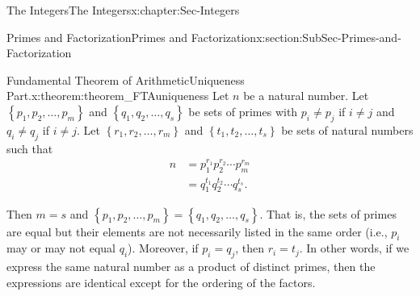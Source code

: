 \documentclass[oneside,10pt,]{book}
\numberwithin{equation}{section}
\newcommand{\set}[1]{\left\{ {#1} \right\}}
\newcommand{\amp}{&}
\begin{document}
\begin{chapterptx}{The Integers}{}{The Integers}{}{}{x:chapter:Sec-Integers}
\begin{sectionptx}{Primes and Factorization}{}{Primes and Factorization}{}{}{x:section:SubSec-Primes-and-Factorization}
\begin{theorem}{Fundamental Theorem of Arithmetic\textendash{}Uniqueness Part.}{}{x:theorem:theorem_FTAuniqueness}
Let \(n\) be a natural number. Let \(\set{p_1,p_2,\ldots,p_m}\) and \(\set{q_1,q_2,\ldots,q_s}\) be sets of primes with \(p_i\ne p_j\) if \(i\ne j\) and \(q_i\ne q_j\) if \(i\ne j\). Let \(\set{r_1,r_2,\ldots,r_m}\) and \(\set{t_1,t_2,\ldots,t_s}\) be sets of natural numbers such that%
\begin{align*}
n \amp = p_1^{r_1} p_2^{r_2} \cdots p_m^{r_m}\\
\amp = q_1^{t_1} q_2^{t_2} \cdots q_s^{t_s}\text{.}
\end{align*}
%
\par
Then \(m = s\) and \(\set{p_1,p_2,\ldots,p_m} = \set{q_1,q_2,\ldots,q_s}\). That is, the sets of primes are equal but their elements are not necessarily listed in the same order (i.e., \(p_i\) may or may not equal \(q_i\)). Moreover, if \(p_i = q_j\), then \(r_i = t_j\). In other words, if we express the same natural number as a product of distinct primes, then the expressions are identical except for the ordering of the factors.%


\end{theorem}
\end{sectionptx}
\end{chapterptx}
\end{document}
